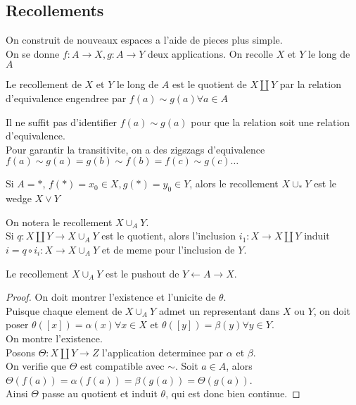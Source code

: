 \documentclass[../main.tex]{subfiles}
\begin{document}
\subsection{Recollements}
On construit de nouveaux espaces a l'aide de pieces plus simple.\\
On se donne $f:A\to X,g:A\to Y$ deux applications. On recolle $X$ et $Y$ le long de $A$ 
\begin{defn}[Recollement]
	Le recollement de $X$ et $Y$ le long de $A$ est le quotient de $X \coprod Y$ par la relation d'equivalence engendree par $f( a) \sim g( a) \forall a\in A$ 
\end{defn}
\begin{rmq}
Il ne suffit pas d'identifier $f( a) \sim g( a) $ pour que la relation soit une relation d'equivalence.\\
Pour garantir la transitivite, on a des zigszags d'equivalence $f( a) \sim g( a) = g( b) \sim f( b) =f( c) \sim g( c) \ldots$ 
\end{rmq}
\begin{exemple}
Si $A= \ast$, $f( \ast) =x_0\in X, g( \ast) = y_0 \in Y$, alors le recollement $ X\cup_\ast Y$ est le wedge $X\vee Y$ 
\end{exemple}
On notera le recollement $X\cup_A Y$.\\
Si $q:X\coprod Y \to X\cup_A Y$ est le quotient, alors l'inclusion $ i_1:X \to X\coprod Y$ induit $i= q\circ i_i:X \to X\cup_A Y$ et de meme pour l'inclusion de $Y$.
\begin{propo}
Le recollement $X\cup_A Y$ est le pushout de $ Y \leftarrow A \rightarrow X$.
\end{propo}
\begin{proof}
On doit montrer l'existence et l'unicite de $\theta$.\\
Puisque chaque element de $X\cup_A Y$ admet un representant dans $X$ ou $Y$, on doit poser $\theta(  [ x] ) = \alpha( x) \forall x \in X$ et $\theta( [ y] ) =\beta( y) \forall y\in Y $.\\
On montre l'existence.\\
Posons $\Theta:X\coprod Y\to Z$ l'application determinee par $\alpha$ et $\beta$.\\
On verifie que $\Theta$ est compatible avec $\sim$. Soit $a\in A$, alors $\Theta( f( a) ) =\alpha( f( a) ) = \beta( g( a) )=\Theta( g( a) )  $.\\
Ainsi $\Theta$ passe au quotient et induit $\theta$, qui est donc bien continue.
\end{proof}
\end{document}
